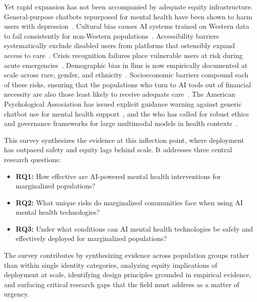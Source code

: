 Yet rapid expansion has not been accompanied by adequate equity infrastructure. General-purpose chatbots repurposed for mental health have been shown to harm users with depression~\cite{he_2022}. Cultural bias causes AI systems trained on Western data to fail consistently for non-Western populations~\cite{aleem_2024}. Accessibility barriers systematically exclude disabled users from platforms that ostensibly expand access to care~\cite{khan_seo_2025}. Crisis recognition failures place vulnerable users at risk during acute emergencies~\cite{de_freitas_2024}. Demographic bias in \gls{llm}s is now empirically documented at scale across race, gender, and ethnicity~\cite{omar_2025,pfohl_2024}. Socioeconomic barriers compound each of these risks, ensuring that the populations who turn to AI tools out of financial necessity are also those least likely to receive adequate care~\cite{robinson_2024,timmons_2023}. The American Psychological Association has issued explicit guidance warning against generic chatbot use for mental health support~\cite{apa_2025}, and the \gls{who} has called for robust ethics and governance frameworks for large multimodal models in health contexts~\cite{who_2025}.

This survey synthesizes the evidence at this inflection point, where deployment has outpaced safety and equity lags behind scale. It addresses three central research questions:

\begin{itemize}
    \item \textbf{RQ1:} How effective are AI-powered mental health interventions for marginalized populations?
    \item \textbf{RQ2:} What unique risks do marginalized communities face when using AI mental health technologies?
    \item \textbf{RQ3:} Under what conditions can AI mental health technologies be safely and effectively deployed for marginalized populations?
\end{itemize}

The survey contributes by synthesizing evidence across population groups rather than within single identity categories, analyzing equity implications of deployment at scale, identifying design principles grounded in empirical evidence, and surfacing critical research gaps that the field must address as a matter of urgency.